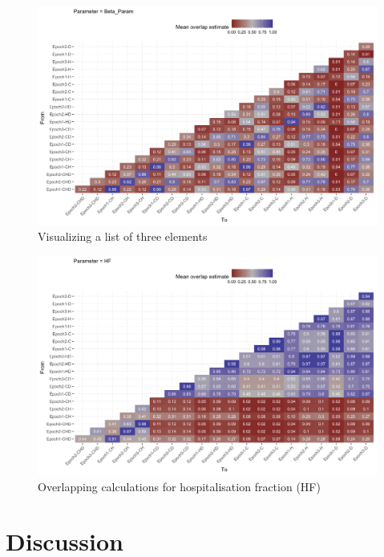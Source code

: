 \documentclass[10pt,letterpaper]{article}
\begin{document}
\begin{figure}
\includegraphics[width=1\linewidth]{diagrams/exp_overlap_beta} \caption{Visualizing a list of three elements}\label{fig:exp-overlap-beta}
\end{figure}

\begin{figure}
\includegraphics[width=1\linewidth]{diagrams/exp_overlap_HF} \caption{Overlapping calculations for hospitalisation fraction (HF)}\label{fig:exp-overlap-hf}
\end{figure}

\hypertarget{discussion}{%
\section{Discussion}\label{discussion}}



\end{document}
